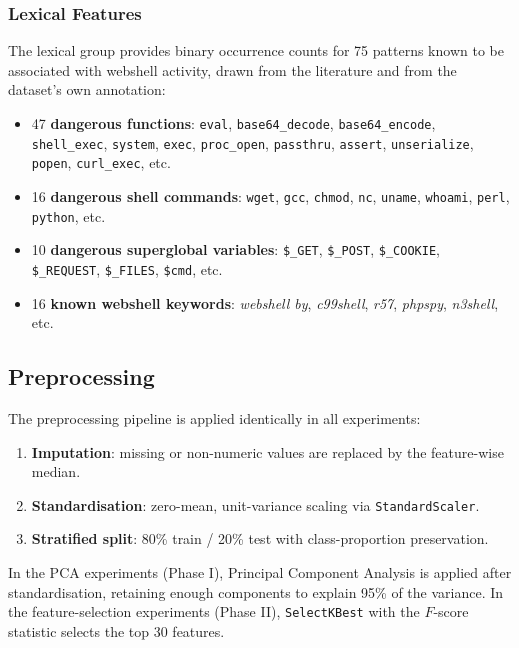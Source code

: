 \documentclass[journal,twocolumn]{IEEEtran}
\begin{document}
\subsubsection{Lexical Features}

The lexical group provides binary occurrence counts for 75 patterns known to be associated with webshell activity, drawn from the literature and from the dataset's own annotation:

\begin{itemize}
  \item 47 \textbf{dangerous functions}: \texttt{eval}, \texttt{base64\_decode}, \texttt{base64\_encode}, \texttt{shell\_exec}, \texttt{system}, \texttt{exec}, \texttt{proc\_open}, \texttt{passthru}, \texttt{assert}, \texttt{unserialize}, \texttt{popen}, \texttt{curl\_exec}, etc.
  \item 16 \textbf{dangerous shell commands}: \texttt{wget}, \texttt{gcc}, \texttt{chmod}, \texttt{nc}, \texttt{uname}, \texttt{whoami}, \texttt{perl}, \texttt{python}, etc.
  \item 10 \textbf{dangerous superglobal variables}: \texttt{\$\_GET}, \texttt{\$\_POST}, \texttt{\$\_COOKIE}, \texttt{\$\_REQUEST}, \texttt{\$\_FILES}, \texttt{\$cmd}, etc.
  \item 16 \textbf{known webshell keywords}: \textit{webshell by}, \textit{c99shell}, \textit{r57}, \textit{phpspy}, \textit{n3shell}, etc.
\end{itemize}

\subsection{Preprocessing}

The preprocessing pipeline is applied identically in all experiments:
\begin{enumerate}
  \item \textbf{Imputation}: missing or non-numeric values are replaced by the feature-wise median.
  \item \textbf{Standardisation}: zero-mean, unit-variance scaling via \texttt{StandardScaler}.
  \item \textbf{Stratified split}: 80\% train / 20\% test with class-proportion preservation.
\end{enumerate}

In the PCA experiments (Phase I), Principal Component Analysis is applied after standardisation, retaining enough components to explain 95\% of the variance. In the feature-selection experiments (Phase II), \texttt{SelectKBest} with the $F$-score statistic selects the top 30 features.
\end{document}
